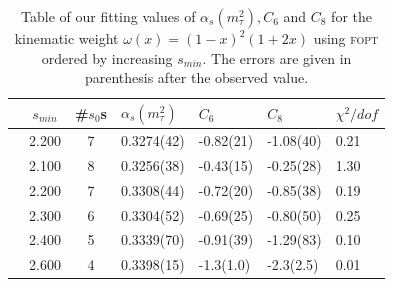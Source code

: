 \documentclass[../../index.tex]{subfiles}
\begin{document}
\begin{table}
  \centering
  \begin{tabularx}{\textwidth}{cccYYYY}
    \toprule
    & \(s_{min}\) & \#\(s_0\)s & \(\alpha_s(m_\tau^2)\) & \(C_6\) & \(C_8\) & \(\chi^2/dof\)  \\
    \midrule
    \parbox[t]{2mm}{}
    & 2.200 & 7 & 0.3274(42) & -0.82(21) & -1.08(40) & 0.21 \\
    \midrule
    \parbox[t]{2mm}{}
    & 2.100 & 8 & 0.3256(38) & -0.43(15) & -0.25(28) & 1.30 \\
    & 2.200 & 7 & 0.3308(44) & -0.72(20) & -0.85(38) & 0.19 \\
    & 2.300 & 6 & 0.3304(52) & -0.69(25) & -0.80(50) & 0.25 \\
    & 2.400 & 5 & 0.3339(70) & -0.91(39) & -1.29(83) & 0.10 \\
    & 2.600 & 4 & 0.3398(15) & -1.3(1.0) & -2.3(2.5) & 0.01  \\
    \bottomrule
  \end{tabularx}
  \caption{Table of our fitting values of \(\alpha_s(m_\tau^2), C_6\) and
    \(C_8\) for the kinematic weight \(\omega(x)=(1-x)^2(1+2x)\) using
    \textsc{fopt} ordered by increasing \(s_{min}\). The errors are given in
    parenthesis after the observed value.}
  \label{table:fitWKinAlD6D8}
\end{table}
\end{document}
